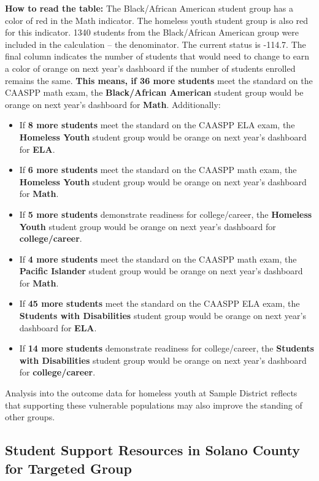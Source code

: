 \documentclass[
  10pt,
  letterpaper,
  DIV=11,
  numbers=noendperiod]{scrartcl}
\begin{document}
\renewcommand*{\arraystretch}{1}

\textbf{How to read the table:} The Black/African American student group
has a color of red in the Math indicator. The homeless youth student
group is also red for this indicator. 1340 students from the
Black/African American group were included in the calculation -- the
denominator. The current status is -114.7. The final column indicates
the number of students that would need to change to earn a color of
orange on next year's dashboard if the number of students enrolled
remains the same. \textbf{This means, if 36 more students} meet the
standard on the CAASPP math exam, the \textbf{Black/African American}
student group would be orange on next year's dashboard for
\textbf{Math}. Additionally:

\begin{itemize}
\item
  If \textbf{8 more students} meet the standard on the CAASPP ELA exam,
  the \textbf{Homeless Youth} student group would be orange on next
  year's dashboard for \textbf{ELA}.
\item
  If \textbf{6 more students} meet the standard on the CAASPP math exam,
  the \textbf{Homeless Youth} student group would be orange on next
  year's dashboard for \textbf{Math}.
\item
  If \textbf{5 more students} demonstrate readiness for college/career,
  the \textbf{Homeless Youth} student group would be orange on next
  year's dashboard for \textbf{college/career}.
\item
  If \textbf{4 more students} meet the standard on the CAASPP math exam,
  the \textbf{Pacific Islander} student group would be orange on next
  year's dashboard for \textbf{Math}.
\item
  If \textbf{45 more students} meet the standard on the CAASPP ELA exam,
  the \textbf{Students with Disabilities} student group would be orange
  on next year's dashboard for \textbf{ELA}.
\item
  If \textbf{14 more students} demonstrate readiness for college/career,
  the \textbf{Students with Disabilities} student group would be orange
  on next year's dashboard for \textbf{college/career}.
\end{itemize}

Analysis into the outcome data for homeless youth at Sample District
reflects that supporting these vulnerable populations may also improve
the standing of other groups.

\subsection{Student Support Resources in Solano County for Targeted
Group}\label{student-support-resources-in-solano-county-for-targeted-group}
\end{document}
